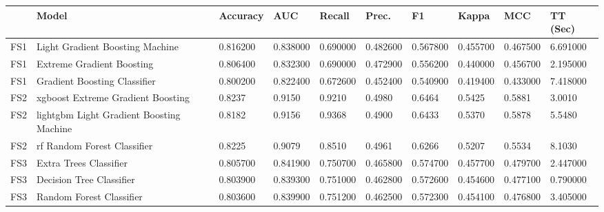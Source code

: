 ﻿\begin{table}[!ht]
    \centering
    \begin{tabular}{|l|l|l|l|l|l|l|l|l|l|}
    \hline
        ~ & Model & Accuracy & AUC & Recall & Prec. & F1 & Kappa & MCC & TT (Sec) \\ \hline
        FS1 & Light Gradient Boosting Machine & 0.816200 & 0.838000 & 0.690000 & 0.482600 & 0.567800 & 0.455700 & 0.467500 & 6.691000 \\ \hline
        FS1 & Extreme Gradient Boosting & 0.806400 & 0.832300 & 0.690000 & 0.472900 & 0.556200 & 0.440000 & 0.456700 & 2.195000 \\ \hline
        FS1 & Gradient Boosting Classifier & 0.800200 & 0.822400 & 0.672600 & 0.452400 & 0.540900 & 0.419400 & 0.433000 & 7.418000 \\ \hline
        FS2 & xgboost	Extreme Gradient Boosting & 0.8237 & 0.9150 & 0.9210 & 0.4980 & 0.6464 & 0.5425 & 0.5881 & 3.0010 \\ \hline
        FS2 & lightgbm	Light Gradient Boosting Machine & 0.8182 & 0.9156 & 0.9368 & 0.4900 & 0.6433 & 0.5370 & 0.5878 & 5.5480 \\ \hline
        FS2 & rf	Random Forest Classifier & 0.8225 & 0.9079 & 0.8510 & 0.4961 & 0.6266 & 0.5207 & 0.5534 & 8.1030 \\ \hline
        FS3 & Extra Trees Classifier & 0.805700 & 0.841900 & 0.750700 & 0.465800 & 0.574700 & 0.457700 & 0.479700 & 2.447000 \\ \hline
        FS3 & Decision Tree Classifier & 0.803900 & 0.839300 & 0.751000 & 0.462800 & 0.572600 & 0.454600 & 0.477100 & 0.790000 \\ \hline
        FS3 & Random Forest Classifier & 0.803600 & 0.839900 & 0.751200 & 0.462500 & 0.572300 & 0.454100 & 0.476800 & 3.405000 \\ \hline
    \end{tabular}
\end{table}
